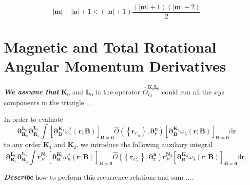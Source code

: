 \documentclass[a4paper,11pt,twoside,openright]{book}
\newcommand{\fixme}[1]{\textbf{\textit{\color{red} #1}}}
\begin{document}
\fixme{\begin{equation}
  |\boldsymbol{m}|+|\boldsymbol{n}|+1 %
    <(|\boldsymbol{n}|+1)\frac{(|\boldsymbol{m}|+1)(|\boldsymbol{m}|+2)}{2}
\end{equation}}

\section{Magnetic and Total Rotational Angular Momentum Derivatives}
\label{sect:magnetic}

\fixme{We assume that} $\boldsymbol{K}_{0}$ and $\boldsymbol{L}_{0}$ in the operator
$\hat{O}_{\ell_{\beta}}^{\boldsymbol{K}_{0}\boldsymbol{L}_{0}}$ could run all the
$xyz$ components in the triangle ...

In order to evaluate
\begin{equation}
  \boldsymbol{\partial}_{\boldsymbol{R}_{\kappa}}^{\boldsymbol{L}_{\kappa}}%
  \boldsymbol{\partial}_{\boldsymbol{R}_{\lambda}}^{\boldsymbol{L}_{\lambda}}%
  \int\left[\boldsymbol{\partial}_{\boldsymbol{B}}^{\boldsymbol{K}_{1}}%
      \omega_{\kappa}^{*}(\boldsymbol{r};\boldsymbol{B})\right]_{\boldsymbol{B}=\boldsymbol{0}}%
    \hat{O}\left(\left\{\boldsymbol{r}_{C_{\alpha}}\right\},\boldsymbol{\partial_{r}^{n}}\right)%
    \left[\boldsymbol{\partial}_{\boldsymbol{B}}^{\boldsymbol{K}_{2}}%
      \omega_{\lambda}(\boldsymbol{r};\boldsymbol{B})\right]_{\boldsymbol{B}=\boldsymbol{0}}\mathrm{d}\boldsymbol{r}
\end{equation}
to any order $\boldsymbol{K}_{1}$ and $\boldsymbol{K}_{2}$, we introduce the following auxiliary integral
\begin{equation}
  \boldsymbol{\partial}_{\boldsymbol{R}_{\kappa}}^{\boldsymbol{L}_{\kappa}}%
  \boldsymbol{\partial}_{\boldsymbol{R}_{\lambda}}^{\boldsymbol{L}_{\lambda}}%
  \int\boldsymbol{r}_{P}^{\boldsymbol{N}_{1}}%
    \left[\boldsymbol{\partial}_{\boldsymbol{B}}^{\boldsymbol{K}_{1}}%
      \omega_{\kappa}^{*}(\boldsymbol{r};\boldsymbol{B})\right]_{\boldsymbol{B}=\boldsymbol{0}}%
    \hat{O}\left(\left\{\boldsymbol{r}_{C_{\alpha}}\right\},\boldsymbol{\partial_{r}^{n}}\right)%
    \boldsymbol{r}_{P}^{\boldsymbol{N}_{2}}%
    \left[\boldsymbol{\partial}_{\boldsymbol{B}}^{\boldsymbol{K}_{2}}%
      \omega_{\lambda}(\boldsymbol{r};\boldsymbol{B})\right]_{\boldsymbol{B}=\boldsymbol{0}}\mathrm{d}\boldsymbol{r},
\end{equation}

\fixme{Describe} how to perform this recurrence relations and sum ....
\end{document}
